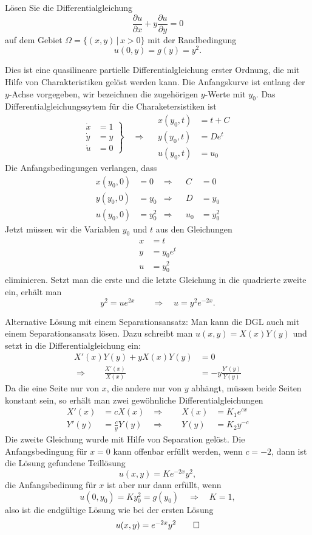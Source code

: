 Lösen Sie die Differentialgleichung
\[
\frac{\partial u}{\partial x}+y\frac{\partial u}{\partial y}=0
\]
auf dem Gebiet $\Omega=\{(x,y)\,|\, x> 0\}$ mit der Randbedingung
\[
u(0,y)=g(y)=y^2.
\]

\begin{loesung}
Dies ist eine quasilineare partielle Differentialgleichung
erster Ordnung, die mit Hilfe von Charakteristiken gelöst werden
kann.
Die Anfangskurve ist entlang der $y$-Achse vorgegeben, wir bezeichnen
die zugehörigen $y$-Werte mit $y_0$.
Das Differentialgleichungssytem für die  Charaketersistiken ist
\[
\left.
\begin{aligned}
\dot x&=1\\
\dot y&=y\\
\dot u&=0
\end{aligned}
\right\}\quad\Rightarrow\quad
\begin{aligned}
x(y_0,t)&=t+C\\
y(y_0,t)&=De^t\\
u(y_0,t)&=u_0
\end{aligned}
\]
Die Anfangsbedingungen verlangen, dass
\begin{align*}
x(y_0,0)&=0&\Rightarrow&&C&=0\\
y(y_0,0)&=y_0&\Rightarrow&&D&=y_0\\
u(y_0,0)&=y_0^2&\Rightarrow&&u_0&=y_0^2
\end{align*}
Jetzt müssen wir die Variablen $y_0$ und $t$ aus den Gleichungen
\begin{align*}
x&=t\\
y&=y_0e^t\\
u&=y_0^2
\end{align*}
eliminieren. Setzt man die erste und die letzte Gleichung in die
quadrierte zweite ein, erhält man
\[
y^2=ue^{2x}\qquad\Rightarrow\quad u=y^2e^{-2x}.
\]

Alternative Lösung mit einem Separationsansatz: Man kann die DGL auch
mit einem Separationsansatz lösen. Dazu schreibt man $u(x,y)=X(x)Y(y)$
und setzt in die Differentialgleichung ein:
\begin{align*}
X'(x)Y(y)+yX(x)Y(y)&=0\\
\Rightarrow\qquad \frac{X'(x)}{X(x)}&=-y\frac{Y'(y)}{Y(y)}
\end{align*}
Da die eine Seite nur von $x$, die andere nur von $y$ abhängt, müssen
beide Seiten konstant sein, so erhält man zwei gewöhnliche
Differentialgleichungen
\begin{align*}
X'(x)&=cX(x)&\Rightarrow\qquad X(x)&=K_1e^{cx}\\
Y'(y)&=\frac{c}{y}Y(y)&\Rightarrow\qquad Y(y)&=K_2y^{-c}
\end{align*}
Die zweite Gleichung wurde mit Hilfe von Separation gelöst.
Die Anfangsbedingung für $x=0$ kann offenbar erfüllt werden,
wenn $c=-2$, dann ist die Lösung gefundene Teillösung
\[
u(x,y)=Ke^{-2x}y^2,
\]
die Anfangsbedinung für $x$ ist aber nur dann erfüllt, wenn
\[
u(0,y_0)=Ky_0^2=g(y_0)\quad\Rightarrow\quad K=1,
\]
also ist die endgültige Lösung wie bei der ersten Lösung
\[
u(x,y)=e^{-2x}y^2
\qedhere
\]
\end{loesung}
